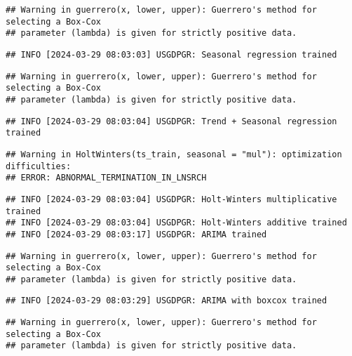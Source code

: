 \documentclass[
]{article}
\begin{document}
\begin{verbatim}
## Warning in guerrero(x, lower, upper): Guerrero's method for selecting a Box-Cox
## parameter (lambda) is given for strictly positive data.
\end{verbatim}

\begin{verbatim}
## INFO [2024-03-29 08:03:03] USGDPGR: Seasonal regression trained
\end{verbatim}

\begin{verbatim}
## Warning in guerrero(x, lower, upper): Guerrero's method for selecting a Box-Cox
## parameter (lambda) is given for strictly positive data.
\end{verbatim}

\begin{verbatim}
## INFO [2024-03-29 08:03:04] USGDPGR: Trend + Seasonal regression trained
\end{verbatim}

\begin{verbatim}
## Warning in HoltWinters(ts_train, seasonal = "mul"): optimization difficulties:
## ERROR: ABNORMAL_TERMINATION_IN_LNSRCH
\end{verbatim}

\begin{verbatim}
## INFO [2024-03-29 08:03:04] USGDPGR: Holt-Winters multiplicative trained
## INFO [2024-03-29 08:03:04] USGDPGR: Holt-Winters additive trained
## INFO [2024-03-29 08:03:17] USGDPGR: ARIMA trained
\end{verbatim}

\begin{verbatim}
## Warning in guerrero(x, lower, upper): Guerrero's method for selecting a Box-Cox
## parameter (lambda) is given for strictly positive data.
\end{verbatim}

\begin{verbatim}
## INFO [2024-03-29 08:03:29] USGDPGR: ARIMA with boxcox trained
\end{verbatim}

\begin{verbatim}
## Warning in guerrero(x, lower, upper): Guerrero's method for selecting a Box-Cox
## parameter (lambda) is given for strictly positive data.
\end{verbatim}
\end{document}
